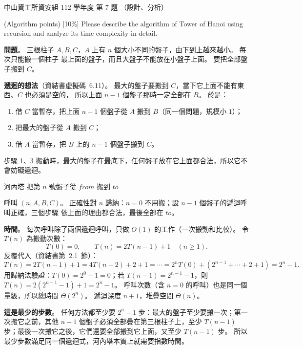 \begin{pastexam}[label={px:nsysu-112-dmalg-07}]{中山資工所資安組 112 學年度 第 7 題}
（設計、分析）

(Algorithm points) [10\%] Please describe the algorithm of Tower of Hanoi using recursion and analyze its
time complexity in detail.
\end{pastexam}

\begin{pastsoln}
\textbf{問題}。 三根柱子 $A, B, C$，$A$ 上有 $n$ 個大小不同的盤子，由下到上越來越小。 每次只能搬一個柱子
最上面的盤子，而且大盤子不能放在小盤子上面。 要把全部盤子搬到 $C$。

\textbf{遞迴的想法}（資結書虛擬碼~6.11）。 最大的盤子要搬到 $C$，當下它上面不能有東西、$C$ 也必須是空的，
所以上面 $n - 1$ 個盤子那時一定全部在 $B$。 於是：
\begin{enumerate}
\item 借 $C$ 當暫存，把上面 $n - 1$ 個盤子從 $A$ 搬到 $B$（同一個問題，規模小 $1$）；
\item 把最大的盤子從 $A$ 搬到 $C$；
\item 借 $A$ 當暫存，把 $B$ 上的 $n - 1$ 個盤子搬到 $C$。
\end{enumerate}
步驟 1、3 搬動時，最大的盤子在最底下，任何盤子放在它上面都合法，所以它不會妨礙遞迴。
\begin{pseudo}{河內塔}
        \State {}
        \State 把第 $n$ 號盤子從 $\mathit{from}$ 搬到 $\mathit{to}$
        \State {}
    \EndIf
\EndProcedure
\end{pseudo}
呼叫 $(n, A, B, C)$。 正確性對 $n$ 歸納：$n = 0$ 不用搬；設 $n - 1$ 個盤子的遞迴呼叫正確，三個步驟
依上面的理由都合法，最後全部在 $\mathit{to}$。

\textbf{時間}。 每次呼叫除了兩個遞迴呼叫，只做 $O(1)$ 的工作（一次搬動和比較）。 令 $T(n)$ 為搬動次數：
\[
T(0) = 0, \qquad T(n) = 2T(n - 1) + 1 \quad (n \ge 1).
\]
反覆代入（資結書第~2.1~節）：
\[
T(n) = 2T(n-1) + 1 = 4T(n-2) + 2 + 1 = \cdots = 2^n T(0) + (2^{n-1} + \cdots + 2 + 1) = 2^n - 1.
\]
用歸納法驗證：$T(0) = 2^0 - 1 = 0$；若 $T(n-1) = 2^{n-1} - 1$，則 $T(n) = 2(2^{n-1} - 1) + 1 = 2^n - 1$。
呼叫次數（含 $n = 0$ 的呼叫）也是同一個量級，所以總時間 $\Theta(2^n)$。 遞迴深度 $n + 1$，堆疊空間 $\Theta(n)$。

\textbf{這是最少的步數}。 任何方法都至少要 $2^n - 1$ 步：最大的盤子至少要搬一次；第一次搬它之前，其他
$n - 1$ 個盤子必須全部疊在第三根柱子上，至少 $T(n-1)$ 步；最後一次搬它之後，它們還要全部搬到它上面，又至少
$T(n-1)$ 步。 所以最少步數滿足同一個遞迴式，河內塔本質上就需要指數時間。
\end{pastsoln}
